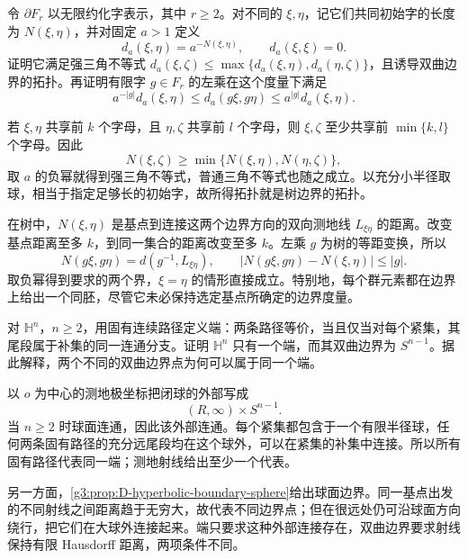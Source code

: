 \begin{exercise}\label{g3:ex:D-tree-boundary-ultrametric}
	令 \(\partial F_r\) 以无限约化字表示，其中 \(r\ge2\)。对不同的 \(\xi,\eta\)，记它们共同初始字的长度为 \(N(\xi,\eta)\)，并对固定 \(a>1\) 定义
	\[
		d_a(\xi,\eta)=a^{-N(\xi,\eta)},\qquad d_a(\xi,\xi)=0.
	\]
	证明它满足强三角不等式
	\(d_a(\xi,\zeta)\le\max\{d_a(\xi,\eta),d_a(\eta,\zeta)\}\)，且诱导双曲边界的拓扑。再证明有限字 \(g\in F_r\) 的左乘在这个度量下满足
	\[
		a^{-|g|}d_a(\xi,\eta)\le d_a(g\xi,g\eta)\le a^{|g|}d_a(\xi,\eta).
	\]
\end{exercise}
\begin{solution}
	若 \(\xi,\eta\) 共享前 \(k\) 个字母，且 \(\eta,\zeta\) 共享前 \(l\) 个字母，则 \(\xi,\zeta\) 至少共享前 \(\min\{k,l\}\) 个字母。因此
	\[
		N(\xi,\zeta)\ge\min\{N(\xi,\eta),N(\eta,\zeta)\},
	\]
	取 \(a\) 的负幂就得到强三角不等式，普通三角不等式也随之成立。以充分小半径取球，相当于指定足够长的初始字，故所得拓扑就是树边界的拓扑。

	在树中，\(N(\xi,\eta)\) 是基点到连接这两个边界方向的双向测地线 \(L_{\xi\eta}\) 的距离。改变基点距离至多 \(k\)，到同一集合的距离改变至多 \(k\)。左乘 \(g\) 为树的等距变换，所以
	\[
		N(g\xi,g\eta)=d(g^{-1},L_{\xi\eta}),\qquad
		\bigl|N(g\xi,g\eta)-N(\xi,\eta)\bigr|\le|g|.
	\]
	取负幂得到要求的两个界，\(\xi=\eta\) 的情形直接成立。特别地，每个群元素都在边界上给出一个同胚，尽管它未必保持选定基点所确定的边界度量。
\end{solution}

\begin{exercise}\label{g3:ex:D-hyperbolic-end-boundary}
	对 \(\mathbb H^n\)，\(n\ge2\)，用固有连续路径定义端：两条路径等价，当且仅当对每个紧集，其尾段属于补集的同一连通分支。证明 \(\mathbb H^n\) 只有一个端，而其双曲边界为 \(S^{n-1}\)。据此解释，两个不同的双曲边界点为何可以属于同一个端。
\end{exercise}
\begin{solution}
	以 \(o\) 为中心的测地极坐标把闭球的外部写成
	\[
		(R,\infty)\times S^{n-1}.
	\]
	当 \(n\ge2\) 时球面连通，因此该外部连通。每个紧集都包含于一个有限半径球，任何两条固有路径的充分远尾段均在这个球外，可以在紧集的补集中连接。所以所有固有路径代表同一端；测地射线给出至少一个代表。

	另一方面，\cref{g3:prop:D-hyperbolic-boundary-sphere}给出球面边界。同一基点出发的不同射线之间距离趋于无穷大，故代表不同边界点；但在很远处仍可沿球面方向绕行，把它们在大球外连接起来。端只要求这种外部连接存在，双曲边界要求射线保持有限 Hausdorff 距离，两项条件不同。
\end{solution}

